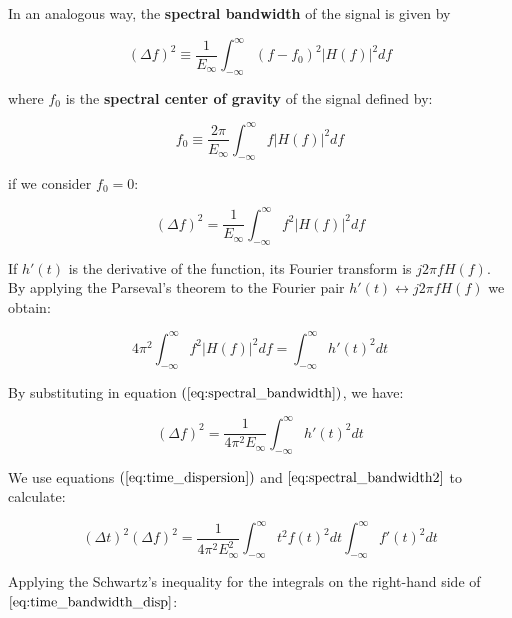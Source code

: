 In an analogous way, the \textbf{spectral bandwidth} of the signal is given by

\begin{equation}\label{eq:spectral_bandwidth_no_centered}
    (\Delta f)^2 \equiv \frac{1}{E_{\infty}} \int_{-\infty}^{\infty} (f-f_{0})^2 |H(f)|^2 df
\end{equation}

where $f_{0}$ is the \textbf{spectral center of gravity} of the signal defined by:

\begin{equation}\label{eq:spectral_center_of_gravity}
    f_0 \equiv  \frac{2 \pi}{E_{\infty}} \int_{-\infty}^{\infty} f |H(f)|^2 df
\end{equation}

if we consider $f_{0}=0$:

\begin{equation}\label{eq:spectral_bandwidth}
    (\Delta f)^2 = \frac{1}{E_{\infty}} \int_{-\infty}^{\infty} f^2 |H(f)|^2 df 
\end{equation}

If $h'(t)$ is the derivative of the function, its Fourier transform is $j2\pi f H(f)$. By applying the Parseval's theorem to the Fourier pair $h'(t)\longleftrightarrow j2\pi f H(f)$ we obtain:

\begin{equation}\label{eq:applyed_parseval_theorem}
    4 \pi^{2} \int_{-\infty}^{\infty} f^2 |H(f)|^2 df =  \int_{-\infty}^{\infty} h'(t)^2 dt
\end{equation}

By substituting in equation $(\eqref{eq:spectral_bandwidth})$, we have:

\begin{equation}\label{eq:spectral_bandwidth2}
    (\Delta f)^2 = \frac{1}{4 \pi^{2} E_{\infty}} \int_{-\infty}^{\infty} h'(t)^2 dt
\end{equation}

We use equations $(\eqref{eq:time_dispersion})$ and $\eqref{eq:spectral_bandwidth2}$ to calculate:

\begin{equation}\label{eq:time_bandwidth_disp}
    (\Delta t)^2(\Delta f)^2 = \frac{1}{4 \pi^{2} E_{\infty}^{2}} \int_{-\infty}^{\infty} t^2f(t)^2 dt \int_{-\infty}^{\infty}f'(t)^2 dt
\end{equation}

Applying the Schwartz's inequality for the integrals on the right-hand side of $\eqref{eq:time_bandwidth_disp}$:

